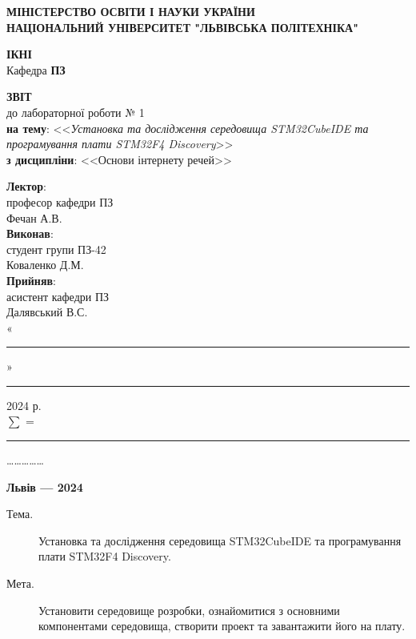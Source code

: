 \documentclass[oneside,14pt]{extarticle}
\newcommand\subject{Основи інтернету речей}
\newcommand\lecturer{професор кафедри ПЗ\\Фечан А.В.}
\newcommand\teacher{асистент кафедри ПЗ\\Далявський В.С.}
\newcommand\mygroup{ПЗ-42}
\newcommand\lab{1}
\newcommand\theme{Установка та дослідження середовища STM32CubeIDE та
	програмування плати STM32F4 Discovery}
\newcommand\purpose{Установити середовище розробки, ознайомитися з основними
	компонентами середовища, створити проект та завантажити його на плату}
\begin{document}
\begin{normalsize}
	\begin{titlepage}
		\thispagestyle{empty}
		\begin{center}
			\textbf{МІНІСТЕРСТВО ОСВІТИ І НАУКИ УКРАЇНИ\\
				НАЦІОНАЛЬНИЙ УНІВЕРСИТЕТ "ЛЬВІВСЬКА ПОЛІТЕХНІКА"}
		\end{center}
		\begin{flushright}
			\textbf{ІКНІ}\\
			Кафедра \textbf{ПЗ}
		\end{flushright}
		\vspace{80pt}
		\begin{center}
			\textbf{ЗВІТ}\\
			\vspace{10pt}
			до лабораторної роботи № \lab\\
			\textbf{на тему}: <<\textit{\theme}>>\\
			\textbf{з дисципліни}: <<\subject>>
		\end{center}
		\vspace{80pt}
		\begin{flushright}
			
			\textbf{Лектор}:\\
			\lecturer\\
			\vspace{28pt}
			\textbf{Виконав}:\\
			
			студент групи \mygroup\\
			Коваленко Д.М.\\
			\vspace{28pt}
			\textbf{Прийняв}:\\
			
			\teacher\\
			
			\vspace{28pt}
			«\rule{1cm}{0.15mm}» \rule{1.5cm}{0.15mm} 2024 р.\\
			$\sum$ = \rule{1cm}{0.15mm}……………\\
			
		\end{flushright}
		\vspace{\fill}
		\begin{center}
			\textbf{Львів — 2024}
		\end{center}
	\end{titlepage}
		
	\begin{description}
		\item[Тема.] \theme.
		\item[Мета.] \purpose.
	\end{description}


\end{normalsize}
\end{document}
